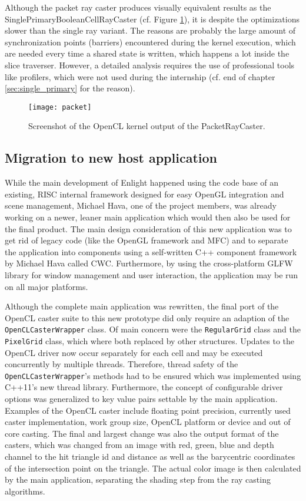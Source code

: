 Although the packet ray caster produces visually equivalent results as the SinglePrimaryBooleanCellRayCaster (cf. Figure \ref{fig:packet}), it is despite the optimizations slower than the single ray variant. The reasons are probably the large amount of synchronization points (barriers) encountered during the kernel execution, which are needed every time a shared state is written, which happens a lot inside the slice traverser. However, a detailed analysis requires the use of professional tools like profilers, which were not used during the internship (cf. end of chapter \ref{sec:single_primary} for the reason).


\begin{figure}
\centering
\texttt{[image: packet]}
\caption{Screenshot of the OpenCL kernel output of the PacketRayCaster.}
\label{fig:packet}
\end{figure}

\subsection{Migration to new host application}
\label{sec:migration}

While the main development of Enlight happened using the code base of an existing, RISC internal framework designed for easy OpenGL integration and scene management, Michael Hava, one of the project members, was already working on a newer, leaner main application which would then also be used for the final product. The main design consideration of this new application was to get rid of legacy code (like the OpenGL framework and MFC) and to separate the application into components using a self-written C++ component framework by Michael Hava called CWC. Furthermore, by using the cross-platform GLFW library for window management and user interaction, the application may be run on all major platforms.

Although the complete main application was rewritten, the final port of the OpenCL caster suite to this new prototype did only require an adaption of the \lstinline!OpenCLCasterWrapper! class. Of main concern were the \lstinline!RegularGrid! class and the \lstinline!PixelGrid! class, which where both replaced by other structures. Updates to the OpenCL driver now occur separately for each cell and may be executed concurrently by multiple threads. Therefore, thread safety of the \lstinline!OpenCLCasterWrapper!'s methods had to be ensured which was implemented using C++11's new thread library. Furthermore, the concept of configurable driver options was generalized to key value pairs settable by the main application. Examples of the OpenCL caster include floating point precision, currently used caster implementation, work group size, OpenCL platform or device and out of core casting. The final and largest change was also the output format of the casters, which was changed from an image with red, green, blue and depth channel to the hit triangle id and distance as well as the barycentric coordinates of the intersection point on the triangle. The actual color image is then calculated by the main application, separating the shading step from the ray casting algorithms.


